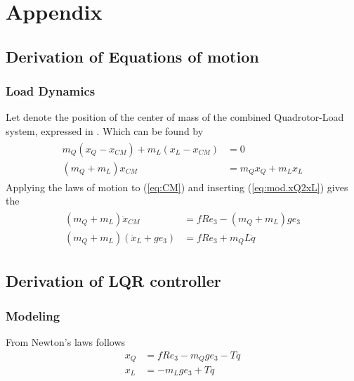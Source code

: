 \chapter{Appendix}

\section{Derivation of Equations of motion}
\subsection{Load Dynamics}\label{sec.app:loaddyn}

Let  denote the position of the center of mass of the combined Quadrotor-Load system, expressed in \IF. Which can be found by
\begin{align}\label{eq:CM}
\begin{split}
m_Q(x_Q-x_{CM})+m_L(x_L-x_{CM})&=0\\
(m_Q+m_L)x_{CM}&=m_Qx_Q+m_Lx_L
\end{split}
\end{align}
Applying the laws of motion to (\ref{eq:CM}) and inserting (\ref{eq:mod.xQ2xL}) gives the 
\begin{align}\label{key}
\begin{split}
(m_Q+m_L)\ddot{x}_{CM}&=fRe_3 - (m_Q+m_L)ge_3\\
(m_Q+m_L)(\ddot{x}_L+ge_3)&= fRe_3+m_QL\ddot{q}
\end{split}
\end{align}



\section{Derivation of LQR controller}\label{app:lqr}

\subsection{Modeling}
From Newton's laws follows
\begin{align}
x_Q&=fRe_3-m_Qge_3-Tq\\
x_L&=-m_Lge_3+Tq
\end{align}

